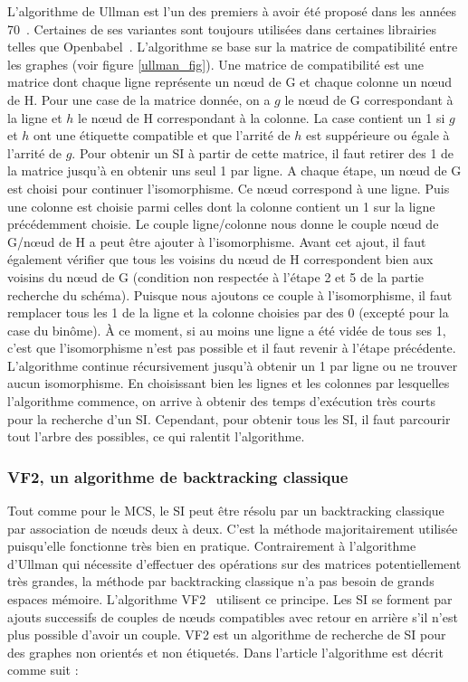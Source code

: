 L'algorithme de Ullman est l'un des premiers à avoir été proposé dans les années 70~\cite{ullmann_algorithm_1976}.
Certaines de ses variantes sont toujours utilisées dans certaines librairies telles que Openbabel~\cite{oboyle_open_2011}.
L'algorithme se base sur la matrice de compatibilité entre les graphes (voir figure \ref{ullman_fig}).
Une matrice de compatibilité est une matrice dont chaque ligne représente un n\oe{}ud de G et chaque colonne un n\oe{}ud de H.
Pour une case de la matrice donnée, on a $g$ le n\oe{}ud de G correspondant à la ligne et $h$ le n\oe{}ud de H correspondant à la colonne.
La case contient un 1 si $g$ et $h$ ont une étiquette compatible et que l'arrité de $h$ est suppérieure ou égale à l'arrité de $g$.
Pour obtenir un SI à partir de cette matrice, il faut retirer des 1 de la matrice jusqu'à en obtenir uns seul 1 par ligne.
A chaque étape, un n\oe{}ud de G est choisi pour continuer l'isomorphisme.
Ce n\oe{}ud correspond à une ligne.
Puis une colonne est choisie parmi celles dont la colonne contient un 1 sur la ligne précédemment choisie.
Le couple ligne/colonne nous donne le couple n\oe{}ud de G/n\oe{}ud de H a peut être ajouter à l'isomorphisme.
Avant cet ajout, il faut également vérifier que tous les voisins du n\oe{}ud de H correspondent bien aux voisins du n\oe{}ud de G (condition non respectée à l'étape 2 et 5 de la partie recherche du schéma).
Puisque nous ajoutons ce couple à l'isomorphisme, il faut remplacer tous les 1 de la ligne et la colonne choisies par des 0 (excepté pour la case du binôme).
À ce moment, si au moins une ligne a été vidée de tous ses 1, c'est que l'isomorphisme n'est pas possible et il faut revenir à l'étape précédente.
L'algorithme continue récursivement jusqu'à obtenir un 1 par ligne ou ne trouver aucun isomorphisme.
En choisissant bien les lignes et les colonnes par lesquelles l'algorithme commence, on arrive à obtenir des temps d'exécution très courts pour la recherche d'un SI.
Cependant, pour obtenir tous les SI, il faut parcourir tout l'arbre des possibles, ce qui ralentit l'algorithme.


\subsubsection{VF2, un algorithme de backtracking classique}

Tout comme pour le MCS, le SI peut être résolu par un backtracking classique par association de n\oe{}uds deux à deux.
C'est la méthode majoritairement utilisée puisqu'elle fonctionne très bien en pratique.
Contrairement à l'algorithme d'Ullman qui nécessite d'effectuer des opérations sur des matrices potentiellement très grandes, la méthode par backtracking classique n'a pas besoin de grands espaces mémoire.
L'algorithme VF2~\cite{cordella_subgraph_2004} utilisent ce principe.
Les SI se forment par ajouts successifs de couples de n\oe{}uds compatibles avec retour en arrière s'il n'est plus possible d'avoir un couple.
VF2 est un algorithme de recherche de SI pour des graphes non orientés et non étiquetés.
Dans l'article l'algorithme est décrit comme suit :

